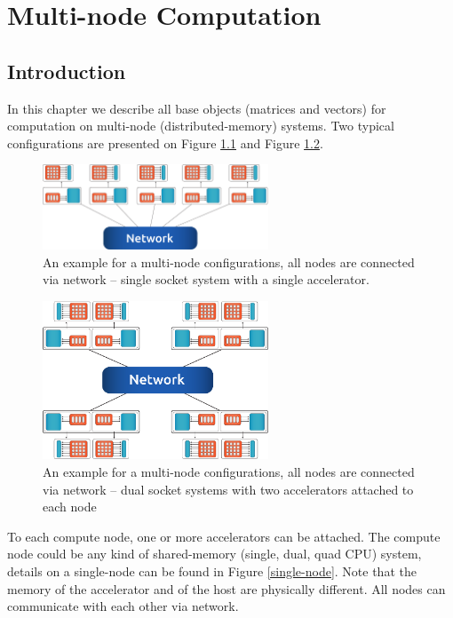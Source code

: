 \chapter{Multi-node Computation}

\section{Introduction}

In this chapter we describe all base objects (matrices and vectors) for computation on multi-node (distributed-memory) systems. Two typical configurations are presented on Figure \ref{multi-node1} and Figure \ref{multi-node2}.

\begin{figure}[!ht]
\centering
\includegraphics[width=0.6\textwidth]{./fig/multi-node.pdf}
\caption{An example for a multi-node configurations, all nodes are connected via network -- single socket system with a single accelerator.}
\label{multi-node1}
\end{figure}

\begin{figure}[!ht]
\centering
\includegraphics[width=0.6\textwidth]{./fig/multi-node2.pdf}
\caption{An example for a multi-node configurations, all nodes are connected via network -- dual socket systems with two accelerators attached to each node}
\label{multi-node2}
\end{figure}


To each compute node, one or more accelerators can be attached. The compute node could be any kind of shared-memory (single, dual, quad CPU) system, details on a single-node can be found in Figure \ref{single-node}. Note that the memory of the accelerator and of the host are physically different. All nodes can communicate with each other via network.

